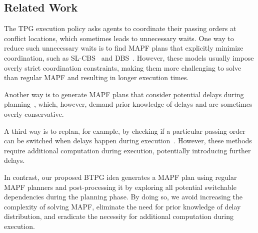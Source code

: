 \documentclass[letterpaper]{article} %
\theoremstyle{definition}
\newcommand{\rishi}[1]{\textcolor{black}{\textbf{Rishi:}} 
\textcolor{purple}{#1}}
\newcommand{\andrew}[1]{\textcolor{black}{\textbf{Yifan:}} \textcolor{blue}{#1}}
\begin{document}
\subsection{Related Work}

The TPG execution policy asks agents to coordinate their passing orders at conflict locations, which sometimes leads to unnecessary waits. 
One way to reduce such unnecessary waits is to find MAPF plans that explicitly minimize coordination, such as SL-CBS~\cite{wagner_minimizing_2022} and DBS~\cite{okumura_offline_2023}. However, these models usually impose overly strict coordination constraints, making them more challenging to solve than regular MAPF and resulting in longer execution times.

Another way is to generate MAPF plans that consider potential delays during planning~\cite{ma_multi-agent_2017, atzmon_robust_2021}, which, however, demand prior knowledge of delays and are sometimes overly conservative.

A third way is to replan, for example, by checking if a particular passing order can be switched when delays happen during execution~\cite{berndt_feedback_2020,paul_fast_2023,pecora_loosely-coupled_2018,coskun_deadlock-free_2021}. However, these methods require additional computation during execution, potentially introducing further delays.

In contrast, our proposed BTPG idea generates a MAPF plan using regular MAPF planners and post-processing it by exploring all potential switchable dependencies during the planning phase. By doing so, we avoid increasing the complexity of solving MAPF, eliminate the need for prior knowledge of delay distribution, and eradicate the necessity for additional computation during execution.

\end{document}
